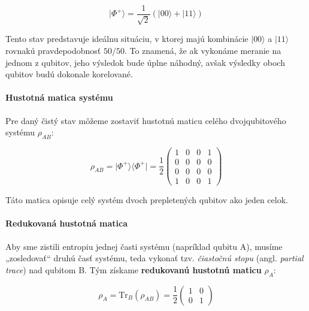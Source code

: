 \begin{equation}
  \lvert \Phi^+ \rangle = \frac{1}{\sqrt{2}}\left(\lvert 00 \rangle + \lvert 11 \rangle\right)
  \label{eq:perfect_bell_pai}
\end{equation}

Tento stav predstavuje ideálnu situáciu, v ktorej majú kombinácie $\lvert 00 \rangle$ a $\lvert 11 \rangle$ rovnakú pravdepodobnosť $50/50$. To znamená, že ak vykonáme meranie na jednom z qubitov, jeho výsledok bude úplne náhodný, avšak výsledky oboch qubitov budú dokonale korelované.

\paragraph{Hustotná matica systému}

Pre daný čistý stav môžeme zostaviť hustotnú maticu celého dvojqubitového systému $\rho_{AB}$:


\begin{equation}
  \rho_{AB} = \lvert \Phi^+ \rangle \langle \Phi^+ \rvert = \frac{1}{2}
  \begin{pmatrix}
    1 & 0 & 0 & 1 \\
    0 & 0 & 0 & 0 \\
    0 & 0 & 0 & 0 \\
    1 & 0 & 0 & 1
  \end{pmatrix}
  \label{eq:bell_pair_matrix}
\end{equation}


Táto matica opisuje celý systém dvoch prepletených qubitov ako jeden celok.

\paragraph{Redukovaná hustotná matica}

Aby sme zistili entropiu jednej časti systému (napríklad qubitu A), musíme „zosledovať“ druhú časť systému, teda vykonať tzv. \textit{čiastočnú stopu} (angl. \textit{partial trace}) nad qubitom B. Tým získame \textbf{redukovanú hustotnú maticu} $\rho_A$:


\begin{equation}
  \rho_A = \mathrm{Tr}_B(\rho_{AB}) = \frac{1}{2}
  \begin{pmatrix}
    1 & 0 \\
    0 & 1
  \end{pmatrix}
  \label{eq:bell_pair_reduced_matrix}
\end{equation}


